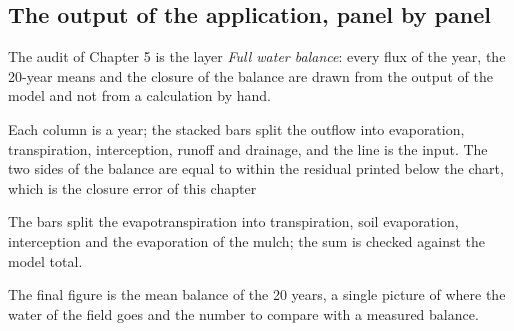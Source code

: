 \subsection{The output of the application, panel by panel}
The audit of Chapter 5 is the layer \emph{Full water balance}: every flux of the year, the 20-year means and the closure of the balance are drawn from the output of the model and not from a calculation by hand.

Each column is a year; the stacked bars split the outflow into evaporation, transpiration, interception, runoff and drainage, and the line is the input. The two sides of the balance are equal to within the residual printed below the chart, which is the closure error of this chapter


The bars split the evapotranspiration into transpiration, soil evaporation, interception and the evaporation of the mulch; the sum is checked against the model total.


The final figure is the mean balance of the 20 years, a single picture of where the water of the field goes and the number to compare with a measured balance.


